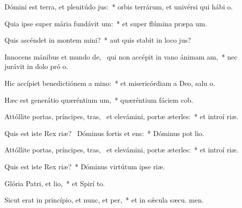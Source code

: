 \item Dómini est terra, et plenitúdo jus:~* orbis terrárum, et univérsi qui hábi  o.
\item Quia ipse super mária fundávit um:~* et super flúmina præpa um.
\item Quis ascéndet in montem mini?~* aut quis stabit in loco  jus?
\item Innocens mánibus et mundo de,~\pscross{} qui non accépit in vano ánimam am,~* nec jurávit in dolo pró o.
\item Hic accípiet benedictiónem a mino:~* et misericórdiam a Deo, salu o.
\item Hæc est generátio quæréntium um,~* quæréntium fáciem  cob.
\item Attóllite portas, príncipes, tras,~\pscross{} et elevámini, portæ æterles:~* et introí  riæ.
\item Quis est iste Rex riæ?~\pscross{} Dóminus fortis et ens:~* Dóminus pot  lio.
\item Attóllite portas, príncipes, tras,~\pscross{} et elevámini, portæ æterles:~* et introí  riæ.
\item Quis est iste Rex riæ?~* Dóminus virtútum ipse   riæ.
\item Glória Patri, et lio,~* et Spirí to.
\item Sicut erat in princípio, et nunc, et per,~* et in sǽcula sæcu. men.
